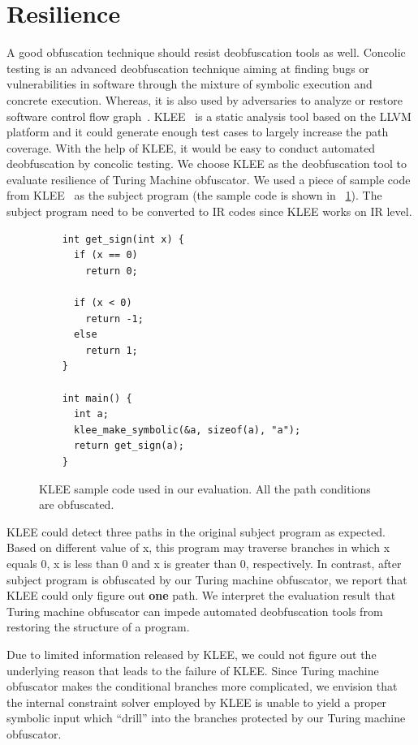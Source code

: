 \section{Resilience}
\label{subsec:resilience}
A good obfuscation technique should resist deobfuscation tools as well. Concolic
testing is an advanced deobfuscation technique aiming at finding bugs or
vulnerabilities in software through the mixture of symbolic execution and
concrete execution. Whereas, it is also used by adversaries to analyze or
restore software control flow graph~\cite{Cadar,Sen,Cute}. KLEE~\cite{klee} is a
static analysis tool based on the LLVM platform and it could generate enough
test cases to largely increase the path coverage. With the help of KLEE, it
would be easy to conduct automated deobfuscation by concolic testing. We choose
KLEE as the deobfuscation tool to evaluate resilience of Turing Machine
obfuscator. We used a piece of sample code from KLEE~\cite{kleesample} as the
subject program (the sample code is shown in \F~\ref{fig:klee-sample}). The
subject program need to be converted to IR codes since KLEE works on IR level.

\begin{figure}[h]
\centering
\begin{lstlisting}
    int get_sign(int x) {
      if (x == 0)
        return 0; 

      if (x < 0)
        return -1;
      else 
        return 1;
    }

    int main() {
      int a;
      klee_make_symbolic(&a, sizeof(a), "a");
      return get_sign(a);
    }
\end{lstlisting}
\caption{KLEE sample code used in our evaluation. All the path conditions are obfuscated.}
\label{fig:klee-sample}
\end{figure}


KLEE could detect three paths in the original subject program as expected. Based
on different value of x, this program may traverse branches in which x equals 0,
x is less than 0 and x is greater than 0, respectively. In contrast, after
subject program is obfuscated by our Turing machine obfuscator, we report that
KLEE could only figure out \textbf{one} path. We interpret the evaluation result
that Turing machine obfuscator can impede automated deobfuscation tools from
restoring the structure of a program.

Due to limited information released by KLEE, we could not figure out the
underlying reason that leads to the failure of KLEE. Since Turing machine
obfuscator makes the conditional branches more complicated, we envision that the
internal constraint solver employed by KLEE is unable to yield a proper symbolic
input which ``drill'' into the branches protected by our Turing machine
obfuscator.

